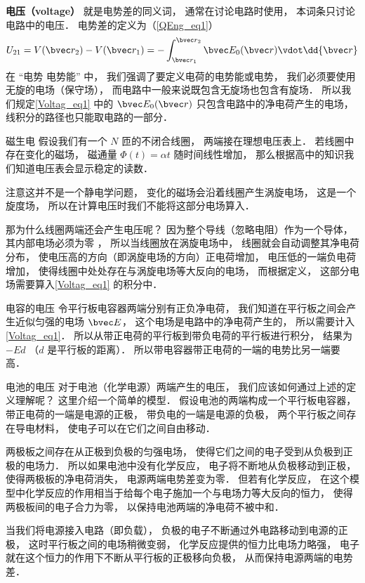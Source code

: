 

\textbf{电压（voltage）} 就是电势差的同义词， 通常在讨论电路时使用， 本词条只讨论电路中的电压． 电势差的定义为（\autoref{QEng_eq1}）
\begin{equation}\label{Voltag_eq1}
U_{21} = V(\bvec r_2) - V(\bvec r_1) = - \int_{\bvec r_1}^{\bvec r_2} \bvec E_0(\bvec r) \vdot \dd{\bvec r}
\end{equation}
在 “电势 电势能” 中， 我们强调了要定义电荷的电势能或电势， 我们必须要使用无旋的电场（保守场）， 而电路中一般来说既包含无旋场也包含有旋场． 所以我们规定\autoref{Voltag_eq1} 中的 $\bvec E_0(\bvec r)$ 只包含电路中的净电荷产生的电场， 线积分的路径也只能取电路的一部分．

\begin{exercise}{磁生电}
假设我们有一个 $N$ 匝的不闭合线圈， 两端接在理想电压表上． 若线圈中存在变化的磁场， 磁通量 $\Phi(t) = \alpha t$ 随时间线性增加， 那么根据高中的知识我们知道电压表会显示稳定的读数．

注意这并不是一个静电学问题， 变化的磁场会沿着线圈产生涡旋电场， 这是一个旋度场， 所以在计算电压时我们不能将这部分电场算入．

那为什么线圈两端还会产生电压呢？ 因为整个导线（忽略电阻）作为一个导体， 其内部电场必须为零%
， 所以当线圈放在涡旋电场中， 线圈就会自动调整其净电荷分布， 使电压高的方向（即涡旋电场的方向）正电荷增加， 电压低的一端负电荷增加， 使得线圈中处处存在与涡旋电场等大反向的电场， 而根据定义， 这部分电场需要算入\autoref{Voltag_eq1} 的积分中．
\end{exercise}

\begin{example}{电容的电压}
令平行板电容器两端分别有正负净电荷， 我们知道在平行板之间会产生近似匀强的电场 $\bvec E$， 这个电场是电路中的净电荷产生的， 所以需要计入\autoref{Voltag_eq1}． 所以从带正电荷的平行板到带负电荷的平行板进行积分， 结果为 $-E d$ （$d$ 是平行板的距离）． 所以带电容器带正电荷的一端的电势比另一端要高．
\end{example}

\begin{example}{电池的电压}
对于电池（化学电源）两端产生的电压， 我们应该如何通过上述的定义理解呢？ 这里介绍一个简单的模型． 假设电池的两端构成一个平行板电容器， 带正电荷的一端是电源的正极， 带负电的一端是电源的负极， 两个平行板之间存在导电材料， 使电子可以在它们之间自由移动．

两极板之间存在从正极到负极的匀强电场， 使得它们之间的电子受到从负极到正极的电场力． 所以如果电池中没有化学反应， 电子将不断地从负极移动到正极， 使得两极板的净电荷消失， 电源两端电势差变为零． 但若有化学反应， 在这个模型中化学反应的作用相当于给每个电子施加一个与电场力等大反向的恒力， 使得两极板间的电子合力为零， 以保持电池两端的净电荷不被中和．

当我们将电源接入电路（即负载）， 负极的电子不断通过外电路移动到电源的正极， 这时平行板之间的电场稍微变弱， 化学反应提供的恒力比电场力略强， 电子就在这个恒力的作用下不断从平行板的正极移向负极， 从而保持电源两端的电势差．
\end{example}
